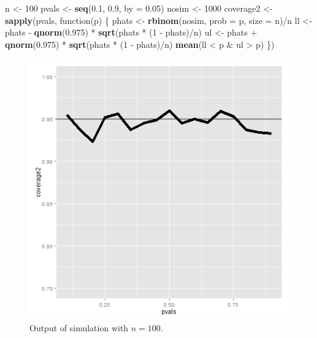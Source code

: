\documentclass[]{article}
\newenvironment{Shaded}{\begin{snugshade}}{\end{snugshade}}
\newcommand{\KeywordTok}[1]{\textcolor[rgb]{0.13,0.29,0.53}{\textbf{{#1}}}}
\newcommand{\DataTypeTok}[1]{\textcolor[rgb]{0.13,0.29,0.53}{{#1}}}
\newcommand{\DecValTok}[1]{\textcolor[rgb]{0.00,0.00,0.81}{{#1}}}
\newcommand{\FloatTok}[1]{\textcolor[rgb]{0.00,0.00,0.81}{{#1}}}
\newcommand{\StringTok}[1]{\textcolor[rgb]{0.31,0.60,0.02}{{#1}}}
\newcommand{\NormalTok}[1]{{#1}}
\begin{document}
\begin{Shaded}
\begin{Highlighting}[]
\NormalTok{n <-}\StringTok{ }\DecValTok{100}
\NormalTok{pvals <-}\StringTok{ }\KeywordTok{seq}\NormalTok{(}\FloatTok{0.1}\NormalTok{, }\FloatTok{0.9}\NormalTok{, }\DataTypeTok{by =} \FloatTok{0.05}\NormalTok{)}
\NormalTok{nosim <-}\StringTok{ }\DecValTok{1000}
\NormalTok{coverage2 <-}\StringTok{ }\KeywordTok{sapply}\NormalTok{(pvals, function(p) \{}
    \NormalTok{phats <-}\StringTok{ }\KeywordTok{rbinom}\NormalTok{(nosim, }\DataTypeTok{prob =} \NormalTok{p, }\DataTypeTok{size =} \NormalTok{n)/n}
    \NormalTok{ll <-}\StringTok{ }\NormalTok{phats -}\StringTok{ }\KeywordTok{qnorm}\NormalTok{(}\FloatTok{0.975}\NormalTok{) *}\StringTok{ }\KeywordTok{sqrt}\NormalTok{(phats *}\StringTok{ }\NormalTok{(}\DecValTok{1} \NormalTok{-}\StringTok{ }\NormalTok{phats)/n)}
    \NormalTok{ul <-}\StringTok{ }\NormalTok{phats +}\StringTok{ }\KeywordTok{qnorm}\NormalTok{(}\FloatTok{0.975}\NormalTok{) *}\StringTok{ }\KeywordTok{sqrt}\NormalTok{(phats *}\StringTok{ }\NormalTok{(}\DecValTok{1} \NormalTok{-}\StringTok{ }\NormalTok{phats)/n)}
    \KeywordTok{mean}\NormalTok{(ll <}\StringTok{ }\NormalTok{p &}\StringTok{ }\NormalTok{ul >}\StringTok{ }\NormalTok{p)}
\NormalTok{\})}
\end{Highlighting}
\end{Shaded}

\begin{figure}[htbp]
\centering
\includegraphics{LeanPub/images/waldCoverage2-1.png}
\caption{Output of simulation with $n=100$.}
\end{figure}
\end{document}
